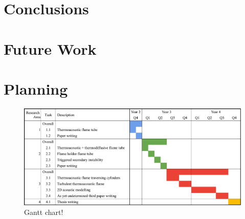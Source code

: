 \section{Conclusions}





\section{Future Work}





\section{Planning}



\begin{figure}[t]
\centering
\includegraphics[scale=0.5]{assets/graphs/2YR_Gantt.pdf}
\caption{Gantt chart!}
\label{fig:gantt}
\end{figure}

